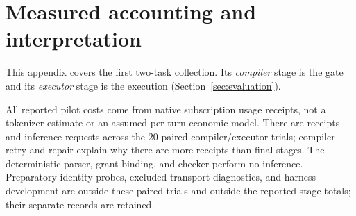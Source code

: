 \documentclass{article}
\theoremstyle{plain}
\theoremstyle{definition}
\newcommand{\id}[1]{\texttt{#1}}
\newcommand{\bnew}{\begingroup\color{revblue}}
\newcommand{\bnew}{\begingroup}
\newcommand{\enew}{\endgroup}
\newcommand{\new}[1]{{\bnew #1\enew}}
\begin{document}
%
%
%
\section{Measured accounting and interpretation}\label{app:tokens}

This appendix covers the first two-task collection. Its \emph{compiler}
stage is the gate and its \emph{executor} stage is the execution
(Section~\ref{sec:evaluation}).

All reported pilot costs come from native subscription usage receipts,
not a tokenizer estimate or an assumed per-turn economic model.
There are \PilotReceipts{} receipts and \PilotInferences{} inference requests across
the 20 paired compiler/executor trials; compiler retry and repair explain
why there are more receipts than final stages. The deterministic parser,
grant binding, and checker perform no inference.
Preparatory identity probes, excluded transport diagnostics, and harness
development are outside these paired trials and outside the reported
stage totals; their separate records are retained.
\end{document}
